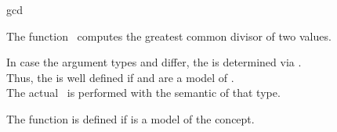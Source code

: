 \begin{ccRefFunction}{gcd}

\ccDefinition

The function \ccRefName\ computes the greatest common divisor of two values.

In case the argument types  and  differ, 
the  is determined via .\\
Thus, the  is well defined if  and  
are a model of . \\
The actual \ccRefName\ is performed with the semantic of that type.

The function is defined if 
is a model of the  concept.



\ccSeeAlso

\\
\\

\end{ccRefFunction}
